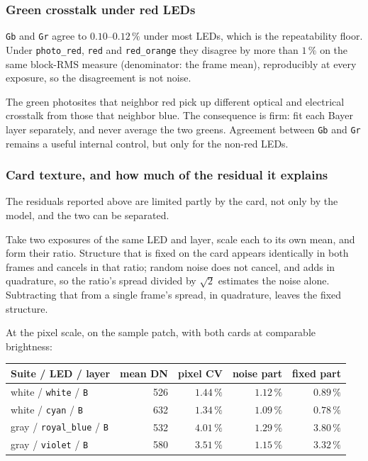 \documentclass[11pt, a4paper]{article}
\newcommand{\code}[1]{\texttt{#1}}
\newcommand{\pct}{\,\%}
\begin{document}
\subsubsection{Green crosstalk under red LEDs}
\label{sec:crosstalk}

\code{Gb} and \code{Gr} agree to $0.10$--$0.12\pct$ under most LEDs,
which is the repeatability floor.
Under \code{photo\_red}, \code{red} and \code{red\_orange}
they disagree by more than $1\pct$ on the same block-RMS measure
(denominator: the frame mean),
reproducibly at every exposure,
so the disagreement is not noise.

The green photosites that neighbor red pick up different optical and
electrical crosstalk from those that neighbor blue.
The consequence is firm:
fit each Bayer layer separately,
and never average the two greens.
Agreement between \code{Gb} and \code{Gr} remains a useful internal
control, but only for the non-red LEDs.

\subsubsection{Card texture, and how much of the residual it explains}
\label{sec:texture}

The residuals reported above are limited partly by the card,
not only by the model,
and the two can be separated.

Take two exposures of the same LED and layer,
scale each to its own mean,
and form their ratio.
Structure that is fixed on the card appears identically in both frames
and cancels in that ratio;
random noise does not cancel, and adds in quadrature,
so the ratio's spread divided by $\sqrt{2}$ estimates the noise alone.
Subtracting that from a single frame's spread, in quadrature,
leaves the fixed structure.

At the pixel scale, on the sample patch,
with both cards at comparable brightness:

\begin{center}
\begin{tabular}{lrrrr}
\toprule
Suite / LED / layer & mean DN & pixel CV & noise part & fixed part \\
\midrule
white / \code{white} / \code{B}      & 526 & $1.44\pct$ & $1.12\pct$ & $0.89\pct$ \\
white / \code{cyan} / \code{B}       & 632 & $1.34\pct$ & $1.09\pct$ & $0.78\pct$ \\
gray / \code{royal\_blue} / \code{B} & 532 & $4.01\pct$ & $1.29\pct$ & $3.80\pct$ \\
gray / \code{violet} / \code{B}      & 580 & $3.51\pct$ & $1.15\pct$ & $3.32\pct$ \\
\bottomrule
\end{tabular}
\end{center}
\end{document}
